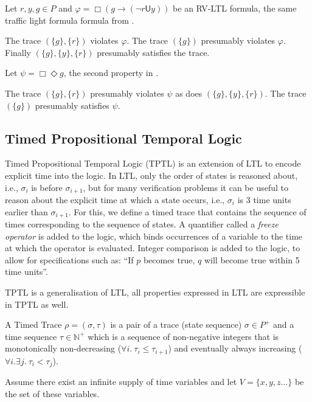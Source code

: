 \documentclass[a4paper]{article}
\newcommand{\U}{\mathsf{U}}
\begin{document}
\begin{eg}
Let $r,y,g\in P$ and $\varphi = \Box (g \to (\neg r \U y))$ be an RV-LTL formula, the same traffic light formula formula from .

  The trace $(\{g\},\{r\})$ violates $\varphi$. The trace $(\{g\})$ presumably violates $\varphi$. Finally $(\{g\},\{y\},\{r\})$ presumably satisfies the trace.

  Let $\psi = \Box \Diamond g $, the second property in .

  The trace $(\{g\},\{r\})$ presumably violates $\psi$ as does $(\{g\},\{y\},\{r\})$. The trace $(\{g\})$ presumably satisfies $\psi$.
\end{eg}

\subsection{Timed Propositional Temporal Logic}
Timed Propositional Temporal Logic (TPTL)\autocite{alur1994really} is an extension of LTL to encode explicit time into the logic.
In LTL, only the order of states is reasoned about, i.e., $\sigma_i$ is before $\sigma_{i+1}$, but for many verification problems it can be useful to reason about the explicit time at which a state occurs, i.e., $\sigma_i$ is 3 time units earlier than $\sigma_{i+1}$.
For this, we define a timed trace that contains the sequence of times corresponding to the sequence of states.
A quantifier called a \emph{freeze operator} is added to the logic, which binds occurrences of a variable to the time at which the operator is evaluated.
Integer comparison is added to the logic, to allow for specifications such as: ``If $p$ becomes true, $q$ will become true within 5 time units''.

TPTL is a generalisation of LTL, all properties expressed in LTL are expressible in TPTL as well.

\begin{defn}

  A Timed Trace $\rho = (\sigma,\tau)$ is a pair of a trace (state sequence) $\sigma \in P^+$ and a time sequence $\tau \in \mathbb{N}^+$ which is a sequence of non-negative integers that is monotonically non-decreasing ($\forall i. ~\tau_i \leq \tau_{i+1}$) and eventually always increasing ($\forall i. \exists j. ~\tau_i < \tau_j$).
\end{defn}

Assume there exist an infinite supply of time variables  and let $V=\{x,y,z\dots\}$ be the set of these variables.
\end{document}

